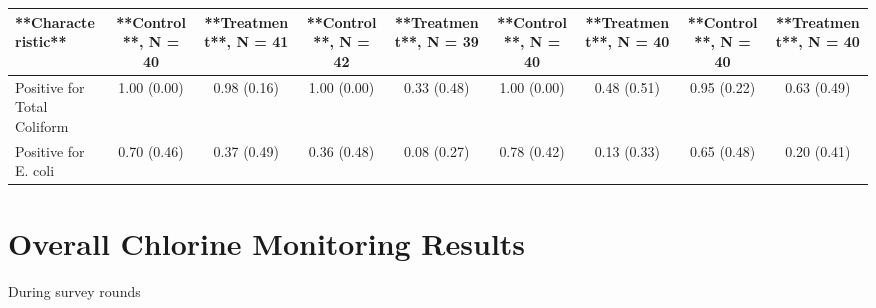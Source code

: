 \documentclass[
]{article}
\begin{document}
\begin{tabular}{l|c|c|c|c|c|c|c|c}
\hline
**Characteristic** & **Control**, N = 40 & **Treatment**, N = 41 & **Control**, N = 42 & **Treatment**, N = 39 & **Control**, N = 40 & **Treatment**, N = 40 & **Control**, N = 40 & **Treatment**, N = 40\\
\hline
Positive for Total Coliform & 1.00 (0.00) & 0.98 (0.16) & 1.00 (0.00) & 0.33 (0.48) & 1.00 (0.00) & 0.48 (0.51) & 0.95 (0.22) & 0.63 (0.49)\\
\hline
Positive for E. coli & 0.70 (0.46) & 0.37 (0.49) & 0.36 (0.48) & 0.08 (0.27) & 0.78 (0.42) & 0.13 (0.33) & 0.65 (0.48) & 0.20 (0.41)\\
\hline
\end{tabular}

\newpage

\hypertarget{overall-chlorine-monitoring-results}{%
\section{Overall Chlorine Monitoring
Results}\label{overall-chlorine-monitoring-results}}

During survey rounds
\end{document}
